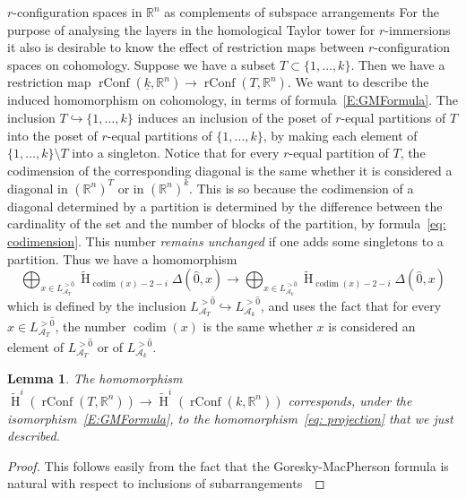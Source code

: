 \documentclass[12pt]{amsart}
\newcommand{\R}{{\mathbb R}}
\newcommand{\Ho}{\operatorname{H}}
\newcommand{\rConf}{\operatorname{rConf}}
\newcommand{\codim}{\operatorname{codim}}
\newcommand{\calA}{{\mathcal{A}}}
\theoremstyle{plain}
\newtheorem{lemma}[thm]{Lemma}
\theoremstyle{definition}
\theoremstyle{remark}
\begin{document}
\begin{section}{$r$-configuration spaces in $\mathbb R^n$ as complements of subspace arrangements}
For the purpose of analysing the layers in the homological Taylor tower for $r$-immersions it also is desirable to know the effect of restriction maps between $r$-configuration spaces on cohomology. Suppose we have a subset $T\subset \{1, \ldots, k\}$. Then we have a restriction map $\rConf(\underline{k}, \R^n)\to \rConf(T, \R^n)$. We want to describe the induced homomorphism on cohomology, in terms of formula~\eqref{E:GMFormula}. The inclusion $T\hookrightarrow \{1, \ldots, k\}$ induces an inclusion of the poset of $r$-equal partitions of $T$ into the poset of $r$-equal partitions of $\{1, \ldots, k\}$, by making each element of $\{1, \ldots, k\}\setminus T$ into a singleton. Notice that for every $r$-equal partition of $T$, the codimension of the corresponding diagonal is the same whether it is considered a diagonal in $(\R^n)^T$ or in $(\R^n)^k$. This is so because the codimension of a diagonal determined by a partition is determined by the difference between the cardinality of the set and the number of blocks of the partition, by formula~\eqref{eq: codimension}. This number {\it remains unchanged} if one adds some singletons to a partition. Thus we have a homomorphism
\begin{equation}\label{eq: projection}
\bigoplus_{x\in{L^{>\hat{0}}_{{\calA}_T}}} \widetilde{\Ho}_{\codim(x)-2-i}\Delta(\hat{0},x)\to \bigoplus_{x\in{L^{>\hat{0}}_{{\calA}_k}}} \widetilde{\Ho}_{\codim(x)-2-i}\Delta(\hat{0},x)
\end{equation}
which is defined by the inclusion $L^{>\hat{0}}_{{\calA}_T}\hookrightarrow L^{>\hat{0}}_{{\calA}_k}$, and uses the fact that for every $x\in {L^{>\hat{0}}_{{\calA}_T}}$, the number $\codim(x)$ is the same whether $x$ is considered an element of $L^{>\hat{0}}_{{\calA}_T}$ or of $L^{>\hat{0}}_{{\calA}_k}$.
\begin{lemma}\label{lemma: naturality}
The homomorphism $\widetilde{\Ho}^{i}(\rConf(T, \R^n))\to \widetilde{\Ho}^{i}(\rConf(k, \R^n))$ corresponds, under the isomorphism~\eqref{E:GMFormula}, to the homomorphism~\eqref{eq: projection} that we just described.
\end{lemma}
\begin{proof}
This follows easily from the fact that the Goresky-MacPherson formula is natural with respect to inclusions of subarrangements~\cite[Corollary 2.1]{Hu:Arrangements}
\end{proof}
\end{section}
\end{document}
